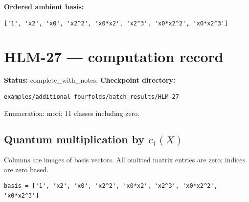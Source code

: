 \documentclass[10pt,a4paper]{article}
\begin{document}
\textbf{Ordered ambient basis:}
\begin{lstlisting}
['1', 'x2', 'x0', 'x2^2', 'x0*x2', 'x2^3', 'x0*x2^2', 'x0*x2^3']
\end{lstlisting}

\clearpage\section*{HLM-27 --- computation record}
\textbf{Status:} complete\_with\_notes.
\textbf{Checkpoint directory:}
\begin{lstlisting}
examples/additional_fourfolds/batch_results/HLM-27
\end{lstlisting}

Enumeration: mori; 11 classes including zero.
\subsection*{Quantum multiplication by $c_1(X)$}
Columns are images of basis vectors. All omitted matrix entries are zero; indices are zero based.

\begin{lstlisting}
basis = ['1', 'x2', 'x0', 'x2^2', 'x0*x2', 'x2^3', 'x0*x2^2', 'x0*x2^3']
\end{lstlisting}
\end{document}
